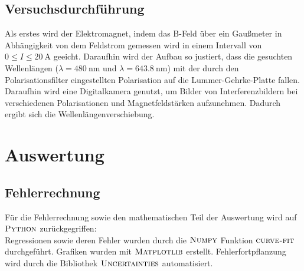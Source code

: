 \documentclass[
  bibliography=totoc,     %
  captions=tableheading,  %
  titlepage=firstiscover, %
]{scrartcl}
\begin{document}
\subsection{Versuchsdurchführung}
Als erstes wird der Elektromagnet, indem das B-Feld über ein Gaußmeter
in Abhängigkeit von dem Feldstrom gemessen wird in einem Intervall von
$0 \leq I \leq \SI{20}{\ampere}$ geeicht.
Daraufhin wird der Aufbau so justiert, dass die gesuchten Wellenlängen
($\lambda = \SI{480}{\nano\meter}$ und $\lambda = \SI{643.8}{\nano\meter}$)
mit der durch den Polarisationsfilter eingestellten Polarisation auf die
Lummer-Gehrke-Platte fallen. Daraufhin wird eine Digitalkamera genutzt, um
Bilder von Interferenzbildern bei verschiedenen Polarisationen und Magnetfeldstärken
aufzunehmen. Dadurch ergibt sich die Wellenlängenverschiebung.

\clearpage
\section{Auswertung}
\label{sec:auswertung}
\subsection{Fehlerrechnung}
Für die Fehlerrechnung sowie den mathematischen Teil der Auswertung wird auf
$\textsc{Python}$ zurückgegriffen:\\
Regressionen sowie deren Fehler wurden durch die $\textsc{Numpy}$ \cite{numpy} Funktion
$\textsc{curve-fit}$ durchgeführt. Grafiken wurden mit $\textsc{Matplotlib}$ \cite{matplotlib}
erstellt.
Fehlerfortpflanzung wird durch die Bibliothek
$\textsc{Uncertainties}$ \cite{uncertainties} automatisiert.
\end{document}
